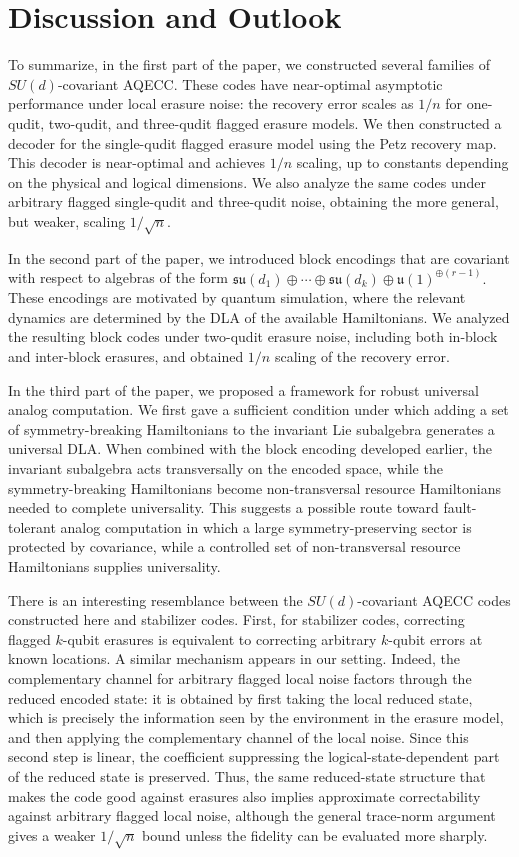 \documentclass[10pt,twocolumn,superscriptaddress,aps,amsmath,amssymb,citeautoscript,floatfix,prx]{revtex4-2}
\newcounter{alg}
\theoremstyle{plain}
\theoremstyle{plain}
\theoremstyle{plain}
\theoremstyle{plain}
\theoremstyle{plain}
\theoremstyle{plain}
\begin{document}
\section{Discussion and Outlook}\label{sec:main_disc}

To summarize, in the first part of the paper, we constructed several families of \(SU(d)\)-covariant AQECC. These codes have near-optimal asymptotic performance under local erasure noise: the recovery error scales
as \(1/n\) for one-qudit, two-qudit, and three-qudit flagged erasure models. We then constructed a decoder for the single-qudit flagged erasure model using the Petz recovery map. This decoder is near-optimal and achieves \(1/n\) scaling, up to constants depending on the physical and logical dimensions. We also analyze the same codes
under arbitrary flagged single-qudit and three-qudit noise, obtaining the more general, but weaker, scaling \(1/\sqrt n\).

In the second part of the paper, we introduced block encodings that are covariant with respect to algebras of the form
$
    \mathfrak{su}(d_1)\oplus\cdots\oplus\mathfrak{su}(d_k)
    \oplus
    \mathfrak{u}(1)^{\oplus(r-1)}.
$
These encodings are motivated by quantum simulation, where the relevant dynamics are determined by the DLA of the available
Hamiltonians. We analyzed the resulting block codes under two-qudit erasure noise, including both in-block and inter-block erasures, and obtained \(1/n\) scaling of the recovery error.

In the third part of the paper, we proposed a framework for robust universal analog computation. We first gave a sufficient condition under which adding a set of symmetry-breaking Hamiltonians to the invariant Lie subalgebra generates a universal DLA. When combined with the block encoding developed
earlier, the invariant subalgebra acts transversally on the encoded space, while the symmetry-breaking Hamiltonians become non-transversal resource Hamiltonians needed to complete universality. This suggests a possible route toward fault-tolerant analog computation in which a large symmetry-preserving sector is protected by covariance, while a controlled
set of non-transversal resource Hamiltonians supplies universality.

There is an interesting resemblance between the \(SU(d)\)-covariant AQECC codes constructed here and stabilizer codes. First, for stabilizer codes, correcting flagged \(k\)-qubit erasures is equivalent to correcting arbitrary \(k\)-qubit errors at known locations. A similar mechanism
appears in our setting. Indeed, the complementary channel for arbitrary flagged local noise factors through the reduced encoded state: it is obtained by first taking the local reduced state, which is precisely the information seen by the environment in the erasure model, and then applying the complementary channel of
the local noise. Since this second step is linear, the coefficient suppressing the logical-state-dependent part of the reduced state is preserved. Thus, the same reduced-state structure that makes the code good against erasures also implies approximate correctability against arbitrary flagged local noise, although the general trace-norm argument gives a weaker \(1/\sqrt n\) bound unless the
fidelity can be evaluated more sharply.
\end{document}
